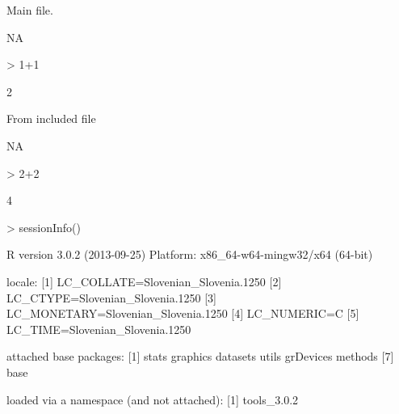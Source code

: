 \documentclass[a4paper,12pt]{article}
\begin{document}
Main file.

NA

\begin{Schunk}
\begin{Sinput}
> 1+1
\end{Sinput}
\begin{Soutput}
[1] 2
\end{Soutput}
\end{Schunk}

\usepackage[utf8]{inputenc} %

From included file

NA

\begin{Schunk}
\begin{Sinput}
> 2+2
\end{Sinput}
\begin{Soutput}
[1] 4
\end{Soutput}
\end{Schunk}

\begin{Schunk}
\begin{Sinput}
> sessionInfo()
\end{Sinput}
\begin{Soutput}
R version 3.0.2 (2013-09-25)
Platform: x86_64-w64-mingw32/x64 (64-bit)

locale:
[1] LC_COLLATE=Slovenian_Slovenia.1250 
[2] LC_CTYPE=Slovenian_Slovenia.1250   
[3] LC_MONETARY=Slovenian_Slovenia.1250
[4] LC_NUMERIC=C                       
[5] LC_TIME=Slovenian_Slovenia.1250    

attached base packages:
[1] stats     graphics  datasets  utils     grDevices methods  
[7] base     

loaded via a namespace (and not attached):
[1] tools_3.0.2
\end{Soutput}
\end{Schunk}
\end{document}
